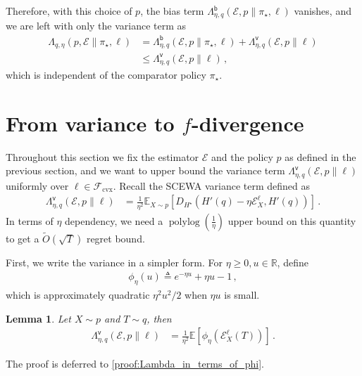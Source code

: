 \documentclass{article}
\theoremstyle{plain}
\newtheorem{lemma}[theorem]{Lemma}
\theoremstyle{definition}
\theoremstyle{plain}
\newcommand{\R}{\mathbb R}
\newcommand{\E}{\mathbb E}
\newcommand{\cE}{\mathcal E}
\newcommand{\cF}{\mathcal F}
\newcommand{\polylog}{\operatorname{polylog}}
\newcommand{\scewaalg}{\textsf{SCEWA}\xspace}
\begin{document}
Therefore, with this choice of $p$, the bias term $\Lambda^{\mathsf{b}}_{\eta,q}(\cE,p\| \pi_\star,\ell)$ vanishes, and we are left with only the variance term as
\begin{align}
    \Lambda_{q,\eta}(p,\cE \| \pi_\star,\ell)
     & =
    \Lambda^{\mathsf{b}}_{\eta,q}(\cE,p\| \pi_\star,\ell)
    +
    \Lambda^{\mathsf{v}}_{\eta,q}(\cE,p\|\ell)
    \\
     & \leq
    \Lambda^{\mathsf{v}}_{\eta,q}(\cE,p\|\ell)\,,
\end{align}
which is independent of the comparator policy $\pi_\star$.



\newpage
\section{From variance to $f$-divergence}
Throughout this section we fix the estimator $\cE$ and the policy $p$ as defined in the previous section, and we want to upper bound the variance term $\Lambda^{\mathsf{v}}_{\eta,q}(\cE,p\|\ell)$ uniformly over $\ell \in \cF_{\mathrm{cvx}}$.
Recall the \scewaalg variance term defined as
\begin{align}
    \Lambda^{\mathsf{v}}_{\eta, q}(\cE, p \| \ell)
     & =
    \frac{1}{\eta^2}
    \E_{X\sim p}\left[
        D_{H^\star}\left(
        H'(q) - \eta \cE^\ell_X, H'(q)
        \right)
        \right]
    \,.
\end{align}
In terms of $\eta$ dependency, we need a $\polylog(\frac{1}{\eta})$ upper bound on this quantity to get a $\tilde{O}(\sqrt{T})$ regret bound.


First, we write the variance in a simpler form.
For $\eta \ge 0, u \in \R$, define
\begin{align}
    \phi_\eta(u) \triangleq e^{-\eta u} + \eta u - 1\,,
\end{align}
which is approximately quadratic $\eta^2 u^2/2$ when $\eta u$ is small.
\begin{lemma}
    \label{prop:Lambda_in_terms_of_phi}
    Let $X \sim p$ and $T \sim q$, then
    \begin{align}
        \Lambda^{\mathsf{v}}_{\eta, q}(\cE, p \| \ell) & =
        \frac{1}{\eta^2}
        \E\left[
            \phi_\eta(\cE_X^\ell(T))
            \right]\,.
        \label{eq:Lambda_in_terms_of_phi}
    \end{align}
\end{lemma}
The proof is deferred to \cref{proof:Lambda_in_terms_of_phi}.
\end{document}
